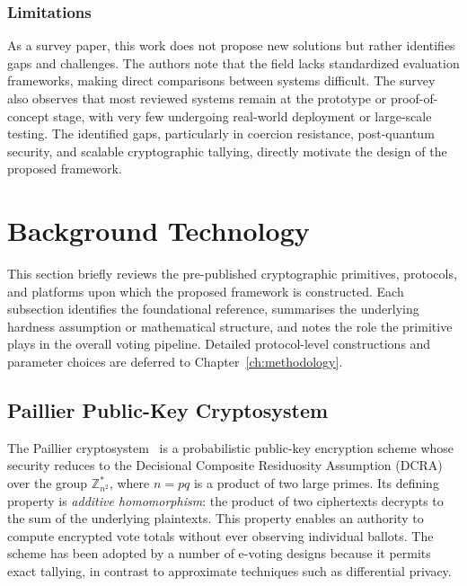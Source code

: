 \subsubsection{Limitations}
\label{subsubsec:survey-limits}

As a survey paper, this work does not propose new solutions but rather identifies gaps and challenges. The authors note that the field lacks standardized evaluation frameworks, making direct comparisons between systems difficult. The survey also observes that most reviewed systems remain at the prototype or proof-of-concept stage, with very few undergoing real-world deployment or large-scale testing. The identified gaps, particularly in coercion resistance, post-quantum security, and scalable cryptographic tallying, directly motivate the design of the proposed framework.

\section{Background Technology}
\label{sec:background-tech}

This section briefly reviews the pre-published cryptographic primitives, protocols, and platforms upon which the proposed framework is constructed. Each subsection identifies the foundational reference, summarises the underlying hardness assumption or mathematical structure, and notes the role the primitive plays in the overall voting pipeline. Detailed protocol-level constructions and parameter choices are deferred to Chapter~\ref{ch:methodology}.

\subsection{Paillier Public-Key Cryptosystem}
\label{subsec:bg-paillier}

The Paillier cryptosystem~\cite{paillier1999} is a probabilistic public-key encryption scheme whose security reduces to the Decisional Composite Residuosity Assumption (DCRA) over the group $\mathbb{Z}_{n^2}^*$, where $n = pq$ is a product of two large primes. Its defining property is \emph{additive homomorphism}: the product of two ciphertexts decrypts to the sum of the underlying plaintexts. This property enables an authority to compute encrypted vote totals without ever observing individual ballots. The scheme has been adopted by a number of e-voting designs because it permits exact tallying, in contrast to approximate techniques such as differential privacy.

